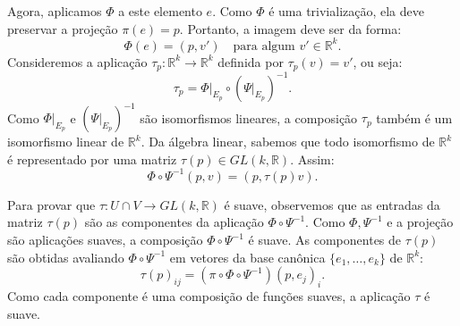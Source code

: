 {\begin{center}
	\end{center}
	Agora, aplicamos $\Phi$ a este elemento $e$. Como $\Phi$ é uma trivialização, ela deve preservar a projeção $\pi(e) = p$. Portanto, a imagem deve ser da forma:
	\begin{equation*}
		\Phi(e) = (p, v') \quad \text{para algum } v' \in \mathbb{R}^k.
	\end{equation*}
	Consideremos a aplicação $\tau_p : \mathbb{R}^k \to \mathbb{R}^k$ definida por $\tau_p(v) = v'$, ou seja:
	\begin{equation*}
		\tau_p = \Phi|_{E_p} \circ (\Psi|_{E_p})^{-1}.
	\end{equation*}
	Como $\Phi|_{E_p}$ e $(\Psi|_{E_p})^{-1}$ são isomorfismos lineares, a composição $\tau_p$ também é um isomorfismo linear de $\mathbb{R}^k$. Da álgebra linear, sabemos que todo isomorfismo de $\mathbb{R}^k$ é representado por uma matriz $\tau(p) \in GL(k, \mathbb{R})$. Assim:
	\begin{equation*}
		\Phi \circ \Psi^{-1}(p, v) = (p, \tau(p)v).
	\end{equation*}
	
	Para provar que $\tau : U \cap V \to GL(k, \mathbb{R})$ é suave, observemos que as entradas da matriz $\tau(p)$ são as componentes da aplicação $\Phi \circ \Psi^{-1}$. Como $\Phi, \Psi^{-1}$ e a projeção são aplicações suaves, a composição $\Phi \circ \Psi^{-1}$ é suave. As componentes de $\tau(p)$ são obtidas avaliando $\Phi \circ \Psi^{-1}$ em vetores da base canônica $\{e_1, \dots, e_k\}$ de $\mathbb{R}^k$:
	\begin{equation*}
		\tau(p)_{ij} = (\pi \circ \Phi \circ \Psi^{-1})(p, e_j)_i.
	\end{equation*}
	Como cada componente é uma composição de funções suaves, a aplicação $\tau$ é suave.
}


